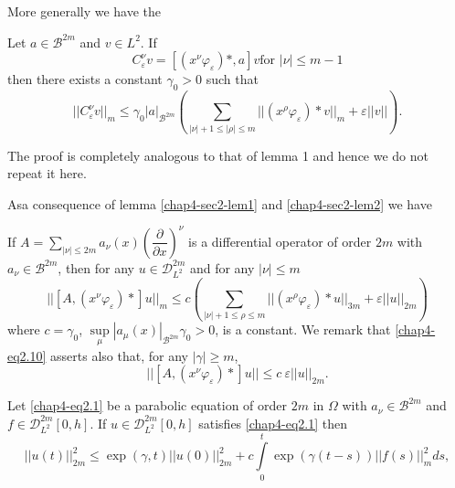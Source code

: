 More generally we have the 

\begin{lemma}\label{chap4-sec2-lem2} %
Let $a \in \mathscr{B}^{2m}$ and $v \in L^2$. If  
\begin{equation*}
C^\nu_{\varepsilon} v = [(x^\nu \varphi_\varepsilon)*, a] v \text{
  for } | \nu | \leq m - 1 \tag{2.8}\label{chap4-eq2.8} 
\end{equation*}
then there exists a constant $\gamma _0 > 0$ such that 
\begin{equation*}
 ||C^\nu_{\varepsilon} v||_m \leq  \gamma_0 |a|_{\mathscr{B}^{2m}}
 \left(\sum_{|\nu|+1\leq|\rho|\leq m} || (x^\rho \varphi_\varepsilon) * v
 ||_m + \varepsilon || v ||\right).  \tag{2.9}\label{chap4-eq2.9}   
\end{equation*}
\end{lemma}

The proof is completely analogous to that of lemma 1 and hence we do
not repeat it here.  

As\pageoriginale a consequence of lemma \ref{chap4-sec2-lem1} and
\ref{chap4-sec2-lem2} we have  

\setcounter{corollary}{0}
\begin{corollary}\label{chap4-sec2-coro1}%
If $A = \sum\limits_{|\nu|\leq 2m} a_\nu (x)
(\dfrac{\partial}{\partial x})^\nu $ is a differential operator of
order $2m$ with $a _\nu 
\in \mathscr{B}^{2m}$, then for any $u \in
\mathscr{D}^{2m}_{L^2}$ and for any $|\nu|\leq m$ 
\begin{equation*}
||[A,(x^\nu \varphi_\varepsilon)* ] u ||_m \leq c
\left(\sum_{|\nu|+1\leq\rho\leq m} || (x^\rho \varphi_\varepsilon) * u
||_{3m} + \varepsilon ||u ||_{2m}\right) \tag{2.10} \label{chap4-eq2.10}
\end{equation*}
 where $c = \gamma _0$, $\sup \limits_{\mu} | a_\mu (x)
 |_{\mathscr{B}^{2m}} \gamma _0 > 0$,  is a constant. We remark that
 \eqref{chap4-eq2.10} asserts also that, for any $|\gamma |\geq m$,  
$$
|| [ A, (x^\nu \varphi_\varepsilon) * ] u || \leq c\ \varepsilon || u
||_{2m}.  
$$
\end{corollary}

\begin{proposition}\label{chap4-sec2-prop2}%
Let \eqref{chap4-eq2.1} be a parabolic equation of order $2m$ in $\Omega$ with
$a_\nu \in \mathscr{B}^{2m}$ and $ f \in
\mathscr{D}^{2m}_{L^2} [0, h]$. If $u \in
\mathscr{D}^{2m}_{L^2} [0, h]$ satisfies \eqref{chap4-eq2.1} then  
\begin{equation*}
|| u (t) ||^2 _{2m} \leq \exp (\gamma , t)|| u (0) ||^2_{2m} + c
\int\limits^t_0 \exp (\gamma (t - s)) || f (s) ||^2_{m} ds,  
\tag{2.11}\label{chap4-eq2.11}
\end{equation*}
\end{proposition}

